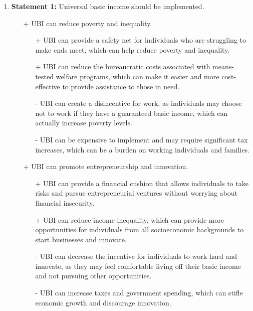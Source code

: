 \documentclass{report}
\begin{document}
\begin{enumerate}
\item \textbf{Statement 1:} Universal basic income should be implemented.
  \begin{itemize}

  \item[+] UBI can reduce poverty and inequality.
  \begin{itemize}
      \item[+] UBI can provide a safety net for individuals who are struggling to make ends meet, which can help reduce poverty and inequality.
      \item[+] UBI can reduce the bureaucratic costs associated with means-tested welfare programs, which can make it easier and more cost-effective to provide assistance to those in need.
      \item[-] UBI can create a disincentive for work, as individuals may choose not to work if they have a guaranteed basic income, which can actually increase poverty levels.
      \item[-] UBI can be expensive to implement and may require significant tax increases, which can be a burden on working individuals and families.
  \end{itemize}

  \item[+] UBI can promote entrepreneurship and innovation.
  \begin{itemize}
      \item[+] UBI can provide a financial cushion that allows individuals to take risks and pursue entrepreneurial ventures without worrying about financial insecurity.
      \item[+] UBI can reduce income inequality, which can provide more opportunities for individuals from all socioeconomic backgrounds to start businesses and innovate.
      \item[-] UBI can decrease the incentive for individuals to work hard and innovate, as they may feel comfortable living off their basic income and not pursuing other opportunities.
      \item[-] UBI can increase taxes and government spending, which can stifle economic growth and discourage innovation.
  \end{itemize}


\end{itemize}
\end{enumerate}
\end{document}
